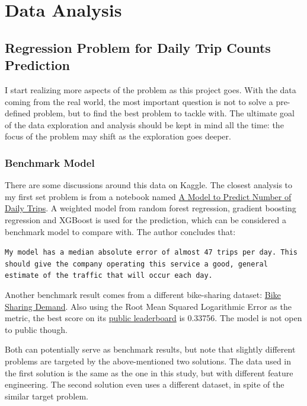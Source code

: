 \documentclass[a4paper]{article}
\begin{document}
\clearpage

	\section{Data Analysis}
		\subsection{Regression Problem for Daily Trip Counts Prediction}
		I start realizing more aspects of the problem as this project goes. With the data coming from the real world, the most important question is not to solve a pre-defined problem, but to find the best problem to tackle with. The ultimate goal of the data exploration and analysis should be kept in mind all the time: the focus of the problem may shift as the exploration goes deeper.
			
			\subsubsection{Benchmark Model}
			There are some discussions around this data on Kaggle. The closest analysis to my first set problem is from a notebook named \href{https://www.kaggle.com/currie32/a-model-to-predict-number-of-daily-trips/notebook}{A Model to Predict Number of Daily Trips}. A weighted model from random forest regression, gradient boosting regression and XGBoost is used for the prediction, which can be considered a benchmark model to compare with. The author concludes that:
			
			\begin{leftbar}
				\texttt{My model has a median absolute error of almost 47 trips per day. This should give the company operating this service a good, general estimate of the traffic that will occur each day.}
			\end{leftbar}
			
			Another benchmark result comes from a different bike-sharing dataset: \href{https://www.kaggle.com/c/bike-sharing-demand/}{Bike Sharing Demand}. Also using the Root Mean Squared Logarithmic Error as the metric, the best score on its \href{https://www.kaggle.com/c/bike-sharing-demand/leaderboard}{public leaderboard} is 0.33756. The model is not open to public though.
			
			Both can potentially serve as benchmark results, but note that slightly different problems are targeted by the above-mentioned two solutions. The data used in the first solution is the same as the one in this study, but with different feature engineering. The second solution even uses a different dataset, in spite of the similar target problem.
			
\end{document}
